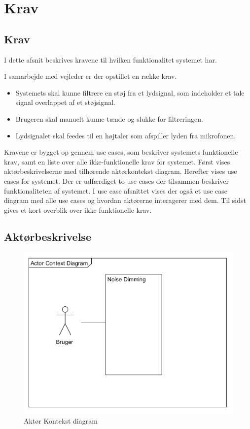 \graphicspath{{Chapters/Krav/}}

\chapter{Krav}
\section{Krav}
I dette afsnit beskrives kravene til hvilken funktionalitet systemet har. 


I samarbejde med vejleder er der opstillet en række krav.
\begin{itemize}
\item Systemets skal kunne filtrere en støj fra et lydsignal, som indeholder et tale signal overlappet af et støjsignal.
\item Brugeren skal manuelt kunne tænde og slukke for filtreringen.
\item Lydsignalet skal feedes til en højtaler som afspiller lyden fra mikrofonen. 
\end{itemize}

Kravene er bygget op gennem use cases, som beskriver systemets funktionelle krav, samt en liste over alle ikke-funktionelle krav for systemet. Først vises aktørbeskrivelserne
med tilhørende aktørkontekst diagram. Herefter vises use cases for systemet. Der er udfærdiget to use cases
der tilsammen beskriver funktionaliteten af systemet. I use case afsnittet vises der også et use case diagram
med alle use cases og hvordan aktørerne interagerer med dem. Til sidst gives et kort overblik over ikke funktionelle krav.

\section{Aktørbeskrivelse}

\begin{figure}[H]
	\centering
	\includegraphics[width = 200 pt]{Img/Aktoer_Kontekst.png}
	\caption{Aktør Kontekst diagram}
	\label{fig:Aktoer Kontekst diagram}
\end{figure}

